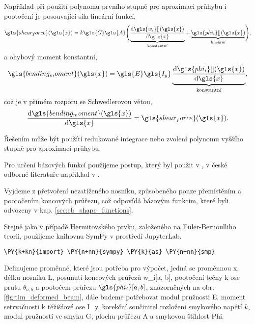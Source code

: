 Například při použití polynomu prvního stupně pro aproximaci průhybu i pootočení je posouvající síla lineární funkcí,
\begin{equation*}
    \gls{shear_force}(\gls{x}) = k \gls{G} \gls{A}  \Biggl(
        \underbrace{\dv{\gls{w_i}[ ](\gls{x})}{\gls{x}}}_{\text{konstantní}} 
        + \underbrace{\gls{phi_i}[ ](\gls{x})}_{\text{lineární}} \Biggr),
\end{equation*}
a ohybový moment konstantní,
\begin{equation*}
    \gls{bending_moment}(\gls{x}) = \gls{E} \gls{I_y} \underbrace{\dv{\gls{phi_i}[ ](\gls{x})}{\gls{x}}}_{\text{konstantní}},
\end{equation*}
což je v přímém rozporu se Schwedlerovou větou,
\begin{equation*}
    \dv{\gls{bending_moment}(\gls{x})}{\gls{x}} = \gls{shear_force}(\gls{x}).
\end{equation*}

Řešením může být použítí redukované integrace nebo zvolení polynomu vyššího stupně pro aproximaci průhybu.

Pro určení bázových funkcí použijeme postup, který byl použit v \cite[kap. 5.6]{przemieniecki1985theory}, v české odborné literatuře například v \cite[kap. 2.2.2]{nmm1}.

Vyjdeme z přetvoření nezatíženého nosníku, způsobeného pouze přemístěním a pootočením koncových průřezu, což odpovídá bázovým funkcím, které byli odvozeny v kap. \ref{sec:eb_shape_functions}.

Stejně jako v případě Hermitovského prvku, založeného na Euler-Bernoulliho teorii, použijeme knihovnu SymPy v prostředí JupyterLab.

\begin{tcolorbox}[breakable, size=fbox, boxrule=1pt, pad at break*=1mm,colback=cellbackground, colframe=cellborder]
    \begin{Verbatim}[commandchars=\\\{\}]
    \PY{k+kn}{import} \PY{n+nn}{sympy} \PY{k}{as} \PY{n+nn}{smp}
    \end{Verbatim}
\end{tcolorbox}

Definujeme proměnné, které jsou potřeba pro výpočet, jedná se proměnnou \gls{x}, délku nosníku \gls{L}, posunutí koncových průřezů \gls{w_i}[a, b], 
pootočení tečny k ose prutu $\theta_{a,b}$ a pootočení průřezu $\gls{phi_i}[a,b]$, znázorněných na obr. \ref{fig:tim_deformed_beam}, dále budeme potřebovat modul pružnosti \gls{E}, moment setrvačnosti k těžišťové ose \gls{I_y}, korekční součinitel rozložení smykového napětí $k$, modul pružnosti ve smyku \gls{G}, plochu průřezu \gls{A} a smykovou štíhlost \gls{Phi}.

